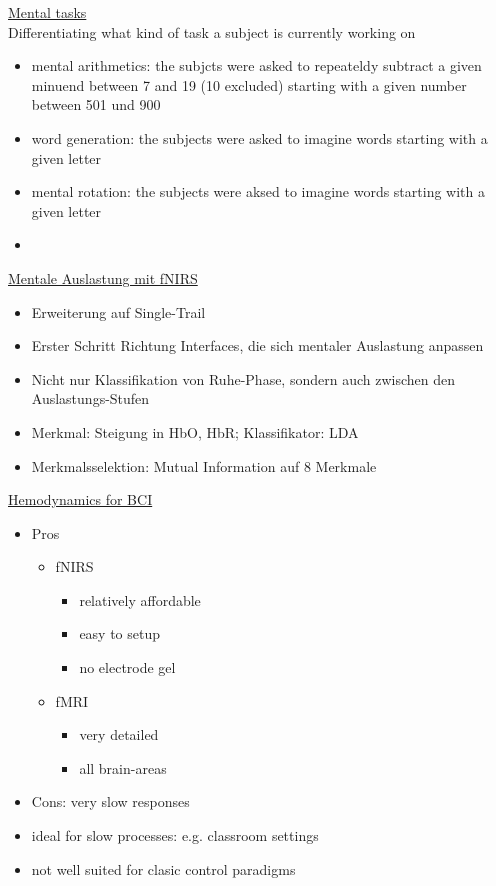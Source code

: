 \documentclass[a4paper,10pt,oneside]{article}
\begin{document}
\underline{Mental tasks} \\
Differentiating what kind of task a subject is currently working on
	\begin{itemize}
		\item mental arithmetics: the subjcts were asked to repeateldy subtract a given minuend between 7 and 19 (10 excluded) starting with a given number between 501 und 900
		\item word generation: the subjects were asked to imagine words starting with a given letter
		\item mental rotation: the subjects were aksed to imagine words starting with a given letter
		\item[] %
	\end{itemize}


\underline{Mentale Auslastung mit fNIRS} \\
	\begin{itemize}
		\item Erweiterung auf Single-Trail
		\item Erster Schritt Richtung Interfaces, die sich mentaler Auslastung anpassen
		\item Nicht nur Klassifikation von Ruhe-Phase, sondern auch zwischen den Auslastungs-Stufen
		\item Merkmal: Steigung in HbO, HbR; Klassifikator: LDA
		\item Merkmalsselektion: Mutual Information auf 8 Merkmale
	\end{itemize}
	

\underline{Hemodynamics for BCI} \\
	\begin{itemize}
		\item Pros
			\begin{itemize}
				\item fNIRS
					\begin{itemize}
						\item relatively affordable
						\item easy to setup
						\item no electrode gel
					\end{itemize}
				\item fMRI
					\begin{itemize}
						\item very detailed
						\item all brain-areas
					\end{itemize}
			\end{itemize}
		\item Cons: very slow responses
		\item ideal for slow processes: e.g. classroom settings
		\item not well suited for clasic control paradigms
	\end{itemize}
 		
\end{document}
